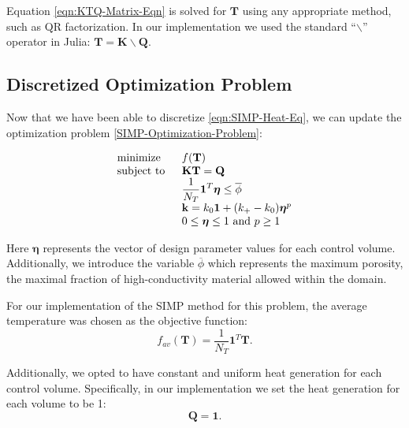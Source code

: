 Equation \eqref{eqn:KTQ-Matrix-Eqn} is solved for $\mathbf{T}$ using any appropriate method, such as QR factorization. In our implementation we used the standard ``$\backslash$'' operator in Julia: $\mathbf{T}=\mathbf{K}\backslash\mathbf{Q}$.

\subsection{Discretized Optimization Problem}

Now that we have been able to discretize \eqref{eqn:SIMP-Heat-Eq}, we can update the optimization problem \eqref{SIMP-Optimization-Problem}:

\begin{equation}
	\begin{tabular}{ll}
		\text{minimize }   & $f(\mathbf{T})$                                                                                     \\
		\text{subject to } & $\mathbf{K}\mathbf{T}=\mathbf{Q}$                                                                   \\
		                   & $\displaystyle\frac{1}{N_T}\mathbf{1}^T\boldsymbol{\eta}\leq\overline{\phi}$ \\
		                   & $\mathbf{k}=k_0\mathbf{1}+(k_+-k_0)\boldsymbol{\eta}^p$                                       \\
		                   & $0\leq\boldsymbol{\eta}\leq 1\text{ and } p\geq 1$
	\end{tabular}\label{Discretized-SIMP-Optimization-Problem}
\end{equation}

Here $\boldsymbol{\eta}$ represents the vector of design parameter values for each control volume. Additionally, we introduce the variable $\overline{\phi}$ which represents the maximum porosity, the maximal fraction of high-conductivity material allowed within the domain.

For our implementation of the SIMP method for this problem, the average temperature was chosen as the objective function:
\begin{equation}
	f_{av}\left(\mathbf{T}\right)=\frac{1}{N_T}\mathbf{1}^T\mathbf{T}.\label{eqn:f_av}
\end{equation}

Additionally, we opted to have constant and uniform heat generation for each control volume. Specifically, in our implementation we set the heat generation for each volume to be 1:
\begin{equation}
	\mathbf{Q}=\mathbf{1}.\label{eqn:Q_vec}
\end{equation}

